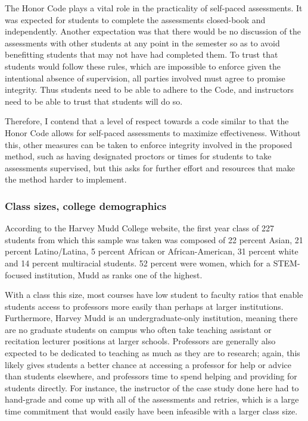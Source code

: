 The Honor Code plays a vital role in the practicality of self-paced assessments. It was expected for students to complete the assessments closed-book and independently. Another expectation was that there would be no discussion of the assessments with other students at any point in the semester so as to avoid benefitting students that may not have had completed them. To trust that students would follow these rules, which are impossible to enforce given the intentional absence of supervision, all parties involved must agree to promise integrity. Thus students need to be able to adhere to the Code, and instructors need to be able to trust that students will do so.

Therefore, I contend that a level of respect towards a code similar to that the Honor Code allows for self-paced assessments to maximize effectiveness. Without this, other measures can be taken to enforce integrity involved in the proposed method, such as having designated proctors or times for students to take assessments supervised, but this asks for further effort and resources that make the method harder to implement.

\subsubsection{Class sizes, college demographics}
According to the Harvey Mudd College website, the first year class of 227 students from which this sample was taken was composed of 22 percent Asian, 21 percent Latino/Latina, 5 percent African or African-American, 31 percent white and 14 percent multiracial students. 52 percent were women, which for a STEM-focused institution, Mudd as ranks one of the highest.

With a class this size, most courses have low student to faculty ratios that enable students access to professors more easily than perhaps at larger institutions. Furthermore, Harvey Mudd is an undergraduate-only institution, meaning there are no graduate students on campus who often take teaching assistant or recitation lecturer positions at larger schools. Professors are generally also expected to be dedicated to teaching as much as they are to research; again, this likely gives students a better chance at accessing a professor for help or advice than students elsewhere, and professors time to spend helping and providing for students directly. For instance, the instructor of the case study done here had to hand-grade and come up with all of the assessments and retries, which is a large time commitment that would easily have been infeasible with a larger class size.

